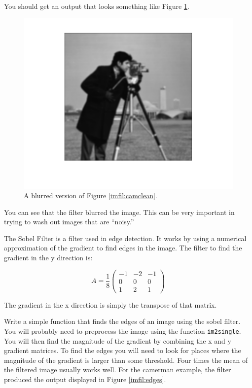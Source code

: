 You should get an output that looks something like Figure \ref{imfil:camblur}.
\begin{figure}
\includegraphics{cameramanBlur.pdf}
\caption{A blurred version of Figure \ref{imfil:camclean}.}
\label{imfil:camblur}
\end{figure}
You can see that the filter blurred the image. This can be very important in trying to wash out images that are ``noisy.''

\begin{problem}

The Sobel Filter is a filter used in edge detection. It works by using a numerical approximation of the gradient to find edges in the image. The filter to find the gradient in the y direction is:

\[
A = \frac{1}{8}\begin{pmatrix}
-1&-2&-1\\
0&0&0\\
1&2&1
\end{pmatrix}
\]

The gradient in the x direction is simply the transpose of that matrix.

Write a simple function that finds the edges of an image using the sobel filter.
You will probably need to preprocess the image using the function {\tt im2single}.
You will then find the magnitude of the gradient by combining the x and y gradient matrices.
To find the edges you will need to look for places where the magnitude of the gradient is larger than some threshold.
Four times the mean of the filtered image usually works well.
For the camerman example, the filter produced the output displayed in Figure \ref{imfil:edges}.
\end{problem}

